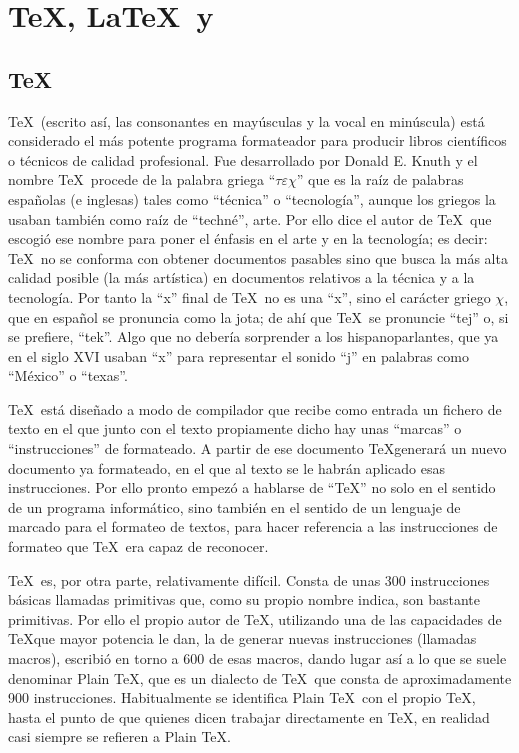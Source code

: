 \chapter{\TeX, \LaTeX \ y \LaTeXe}
	
	\section{\TeX}
		
		\TeX \ (escrito así, las consonantes en mayúsculas y la vocal en minúscula) está considerado el más potente programa formateador para producir libros científicos o técnicos de calidad profesional. Fue desarrollado por Donald E. Knuth y el nombre \TeX \ procede de la palabra griega ``$ \tau\varepsilon\chi $'' que es la raíz de palabras españolas (e inglesas) tales como ``técnica'' o ``tecnología'', aunque los griegos la usaban también como raíz de ``techné'', arte. Por ello dice el autor de \TeX \ que escogió ese nombre para poner el énfasis en el arte y en la tecnología; es decir: \TeX \ no se conforma con obtener documentos pasables sino que busca la más alta calidad posible (la más artística) en documentos relativos a la técnica y a la tecnología. Por tanto la ``x'' final de \TeX \ no es una ``x'', sino el carácter griego $ \chi $, que en español se pronuncia como la jota; de ahí que \TeX \ se pronuncie ``tej'' o, si se prefiere, ``tek''. Algo que no debería sorprender a los hispanoparlantes, que ya en el siglo XVI usaban “x” para representar el sonido ``j'' en palabras como ``México'' o ``texas''.
		
		\TeX \ está diseñado a modo de compilador que recibe como entrada un fichero de texto en el que junto con el texto propiamente dicho hay unas “marcas” o “instrucciones” de formateado. A partir de ese documento \TeX generará un nuevo documento ya formateado, en el que al texto se le habrán aplicado esas instrucciones. Por ello pronto empezó a hablarse de ``\TeX'' no solo en el sentido de un programa informático, sino también en el sentido de un lenguaje de marcado para el formateo de textos, para hacer referencia a las instrucciones de formateo que \TeX \ era capaz de reconocer.
		
		\TeX \ es, por otra parte, relativamente difícil. Consta de unas 300 instrucciones básicas llamadas primitivas que, como su propio nombre indica, son bastante primitivas. Por ello el propio autor de \TeX, utilizando una de las capacidades de \TeX que mayor potencia le dan, la de generar nuevas instrucciones (llamadas macros), escribió en torno a 600 de esas macros, dando lugar así a lo que se suele denominar Plain \TeX, que es un dialecto de \TeX \ que consta de aproximadamente 900 instrucciones. Habitualmente se identifica Plain \TeX \ con el propio \TeX, hasta el punto de que quienes dicen trabajar directamente en \TeX, en realidad casi siempre se refieren a Plain \TeX.
		
